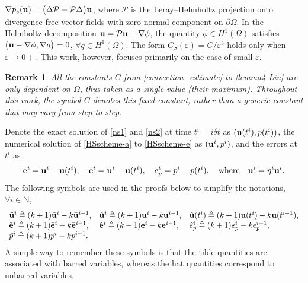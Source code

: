 \documentclass{article}
\newtheorem{remark}[theorem]{Remark}
\theoremstyle{definition}                   %
\begin{document}
$\nabla p_s({\bf u})
= \bigl( \Delta \mathcal{P} - \mathcal{P}\Delta \bigr){\bf u}$, 
where $\mathcal{P}$ is the Leray--Helmholtz projection onto divergence-free vector fields with zero normal component on
$\partial\Omega$. In the Helmholtz decomposition
${\bf u} = \mathcal{P}{\bf u} + \nabla \phi$, the quantity $\phi \in H^{1}(\Omega)$ satisfies 
$\bigl( {\bf u} - \nabla \phi, \nabla q \bigr) = 0$, 
$\forall q \in H^{1}(\Omega)$. 
The form $C_S(\varepsilon)=C/\varepsilon^3$ holds only when $\varepsilon\to 0+$. 
This work, however, focuses primarily on the case of small $\varepsilon$. 
\begin{remark}
All the constants $C$ from \eqref{convection_estimate} to \eqref{lemma4-Liu} 
are only dependent on $\Omega$, thus taken as a single value (their maximum). Throughout this work, the symbol $C$ denotes this fixed constant, rather than a generic constant that may vary from step to step.
\end{remark}


Denote the exact solution of \eqref{ns1} and \eqref{ns2} at time $t^i=i \delta t$ as $({\bf u}(t^i), p(t^i))$, the numerical solution of \eqref{HSscheme-a} to \eqref{HSscheme-e} as $({\bf u}^i, p^i)$, 
and the errors at $t^i$  as 
\begin{align}
{\bf e}^i = {\bf u}^i - {\bf u}(t^i),
\quad
{\bf \bar e}^i = {\bf \bar u}^i - {\bf u}(t^i),
\quad
{e}^i_p = p^i - p(t^i),
\quad
\text{where} \quad {\bf u}^i = \eta^i \bar{\bf u}^i.
\end{align}
The following symbols are used in the proofs below to simplify the notations, $\forall i\in\mathbb{N}$,
\begin{equation}
\begin{array}{lll}
\tilde{\bf u}^i \triangleq (k+1) \bar{\bf u}^i - k \bar{\bf u}^{i-1}, 
&
\hat{\bf u}^i \triangleq (k+1) {\bf u}^i - k {\bf u}^{i-1},
&
\hat{\bf u}(t^i) \triangleq (k+1) {\bf u}(t^i) - k {\bf u}(t^{i-1}),
\\
\tilde{\bf e}^i \triangleq (k+1) \bar{\bf e}^i - k \bar{\bf e}^{i-1}, 
&
\hat{\bf e}^i \triangleq (k+1) {\bf e}^i - k {\bf e}^{i-1}, 
&
\hat{e}^i_p \triangleq (k+1)e^i_p - k e^{i-1}_p,
\\
\hat{p}^i \triangleq (k+1) p^i - k p^{i-1}.
& &
\end{array}
\label{notations}
\end{equation}
A simple way to remember these symbols is that the tilde quantities are associated with barred variables, whereas the hat quantities correspond to unbarred variables.
\end{document}

